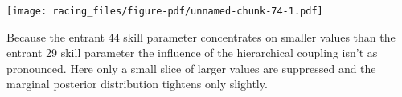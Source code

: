 \documentclass[
  letterpaper,
  DIV=11,
  numbers=noendperiod]{scrartcl}
\newenvironment{Shaded}{\begin{snugshade}}{\end{snugshade}}
\newcommand{\AttributeTok}[1]{\textcolor[rgb]{0.40,0.45,0.13}{#1}}
\newcommand{\ControlFlowTok}[1]{\textcolor[rgb]{0.00,0.23,0.31}{#1}}
\newcommand{\FloatTok}[1]{\textcolor[rgb]{0.68,0.00,0.00}{#1}}
\newcommand{\FunctionTok}[1]{\textcolor[rgb]{0.28,0.35,0.67}{#1}}
\newcommand{\NormalTok}[1]{\textcolor[rgb]{0.00,0.23,0.31}{#1}}
\newcommand{\OtherTok}[1]{\textcolor[rgb]{0.00,0.23,0.31}{#1}}
\newcommand{\SpecialCharTok}[1]{\textcolor[rgb]{0.37,0.37,0.37}{#1}}
\newcommand{\StringTok}[1]{\textcolor[rgb]{0.13,0.47,0.30}{#1}}
\begin{document}
\begin{Shaded}
\end{Shaded}

\texttt{[image: racing\_files/figure-pdf/unnamed-chunk-74-1.pdf]}

Because the entrant 44 skill parameter concentrates on smaller values
than the entrant 29 skill parameter the influence of the hierarchical
coupling isn't as pronounced. Here only a small slice of larger values
are suppressed and the marginal posterior distribution tightens only
slightly.
\end{document}

